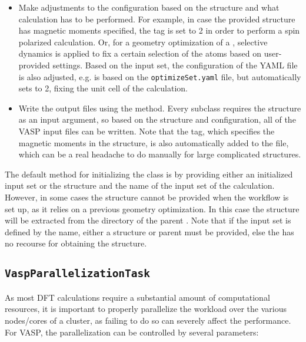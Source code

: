 \begin{refsection}
\begin{itemize}
\item Make adjustments to the configuration based on the structure and what 
calculation has to be performed. For example, in case the provided structure 
has magnetic moments specified, the  tag is set to 2 in order to 
perform a spin polarized calculation. Or, for a geometry optimization of a 
, selective dynamics is applied to fix a 
certain selection of the atoms based on user-provided settings. Based on the 
input set, the configuration of the YAML file is also adjusted, e.g. 
 is based on the \texttt{optimizeSet.yaml} file, but 
automatically sets  to 2, fixing the unit cell of the calculation. 
 
\item Write the output files using the  method. Every 
 subclass requires the structure as an input argument, so based 
on the structure and configuration, all of the VASP input files can 
be written. Note that the  tag, which specifies the magnetic 
moments in the structure, is also automatically added to the  
file, which can be a real headache to do manually for large complicated 
structures. 
 
\end{itemize} 
 
The default method for initializing the  class is by 
providing either an initialized input set or the structure and the name of the 
input set of the calculation. However, in some cases the structure cannot be 
provided when the workflow is set up, as it relies on a previous geometry 
optimization. In this case the structure will be extracted from the directory 
of the parent . Note that if the input set is defined by the 
name, either a structure or parent  must be provided, else the 
 has no recourse for obtaining the structure. 
 
\subsection{\texttt{VaspParallelizationTask}} 
\label{automation:sec-VaspParallelizationTask} 
 
As most DFT calculations require a substantial amount of computational 
resources, it is important to properly parallelize the workload over the 
various nodes/cores of a cluster, as failing to do so can severely affect the 
performance. For VASP, the parallelization can be controlled by 
several parameters: 
 

\end{refsection}
